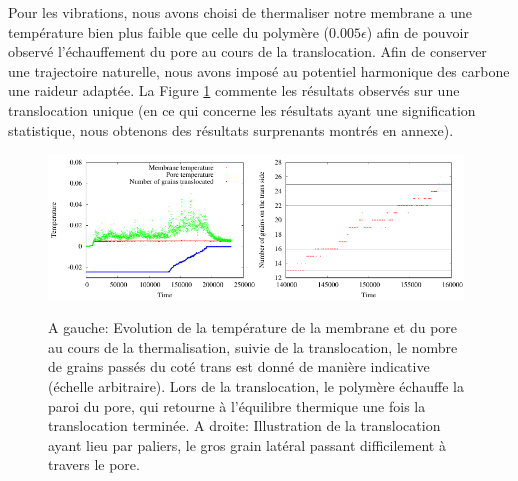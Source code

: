 \documentclass[a4paper,11pt]{article}
\begin{document}
Pour les vibrations, nous avons choisi de thermaliser notre membrane a une température bien plus faible que celle du polymère ($0.005\epsilon$) afin de pouvoir observé l'échauffement du pore au cours de la translocation. Afin de conserver une trajectoire naturelle, nous avons imposé au potentiel harmonique des carbone une raideur adaptée. La Figure \ref{temperature} commente les résultats observés sur une translocation unique (en ce qui concerne les résultats ayant une signification statistique, nous obtenons des résultats surprenants montrés en annexe).
\begin{figure}[H]
\begin{center}
\includegraphics[width=0.49\textwidth]{tempmurmobil.pdf}\includegraphics[width=0.49\textwidth]{murmobil.pdf}

\caption{A gauche: Evolution de la température de la membrane et du pore au cours de la thermalisation, suivie de la translocation, le nombre de grains passés du coté trans est donné de manière indicative (échelle arbitraire). Lors de la translocation, le polymère échauffe la paroi du pore, qui retourne à l'équilibre thermique une fois la translocation terminée. A droite: Illustration de la translocation ayant lieu par paliers, le gros grain latéral passant difficilement à travers le pore.}
\label{temperature}
\end{center}
\end{figure}






\end{document}
